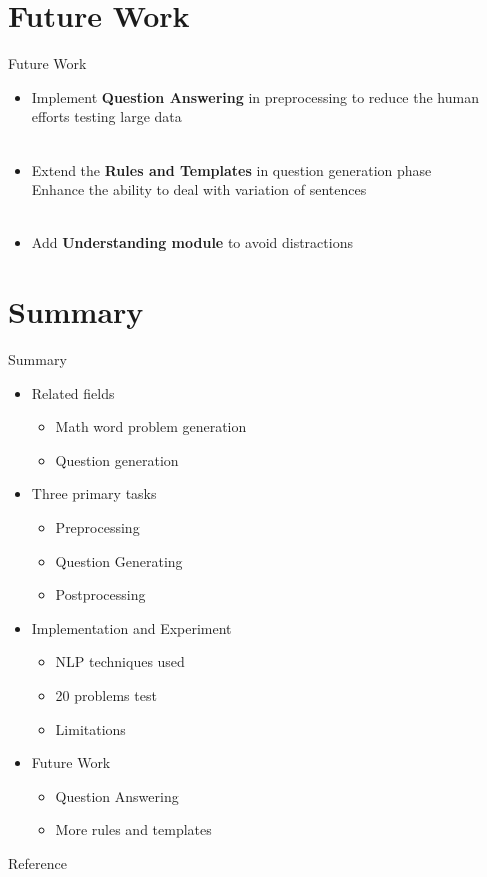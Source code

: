 \documentclass[11pt]{beamer}
\begin{document}
\section{Future Work}

\begin{frame}{Future Work}
    \begin{itemize}
    \item Implement \textbf{Question Answering} in preprocessing to reduce the human efforts testing large data~\\
    ~\\
    \item Extend the \textbf{Rules and Templates} in question generation phase\\
    Enhance the ability to deal with variation of sentences\\
    ~\\
    \item Add \textbf{Understanding module} to avoid distractions
    \end{itemize}
\end{frame}

\section{Summary}

\begin{frame}{Summary}
    \begin{itemize}
    \item Related fields
    \begin{itemize}
        \item Math word problem generation
        \item Question generation
    \end{itemize}
    \item Three primary tasks
    \begin{itemize}
        \item Preprocessing
        \item Question Generating
        \item Postprocessing
    \end{itemize}
    \item Implementation and Experiment
    \begin{itemize}
        \item NLP techniques used
        \item 20 problems test
        \item Limitations
    \end{itemize}
    \item Future Work
    \begin{itemize}
        \item Question Answering
        \item More rules and templates
    \end{itemize}
    \end{itemize}
\end{frame}

\begin{frame}{Reference}


\end{frame}
\end{document}
